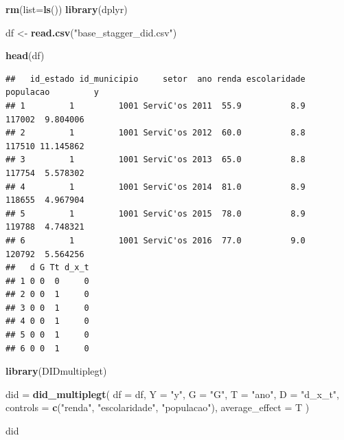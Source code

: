 \documentclass[
]{article}
\author{}
\date{\vspace{-2.5em}}
\newenvironment{Shaded}{\begin{snugshade}}{\end{snugshade}}
\newcommand{\AttributeTok}[1]{\textcolor[rgb]{0.13,0.29,0.53}{#1}}
\newcommand{\FunctionTok}[1]{\textcolor[rgb]{0.13,0.29,0.53}{\textbf{#1}}}
\newcommand{\NormalTok}[1]{#1}
\newcommand{\OtherTok}[1]{\textcolor[rgb]{0.56,0.35,0.01}{#1}}
\newcommand{\StringTok}[1]{\textcolor[rgb]{0.31,0.60,0.02}{#1}}
\begin{document}
\begin{Shaded}
\begin{Highlighting}[]
\FunctionTok{rm}\NormalTok{(}\AttributeTok{list=}\FunctionTok{ls}\NormalTok{())}
\FunctionTok{library}\NormalTok{(dplyr)}

\NormalTok{df }\OtherTok{\textless{}{-}} \FunctionTok{read.csv}\NormalTok{(}\StringTok{"base\_stagger\_did.csv"}\NormalTok{)}

\FunctionTok{head}\NormalTok{(df)}
\end{Highlighting}
\end{Shaded}

\begin{verbatim}
##   id_estado id_municipio     setor  ano renda escolaridade populacao         y
## 1         1         1001 ServiC'os 2011  55.9          8.9    117002  9.804006
## 2         1         1001 ServiC'os 2012  60.0          8.8    117510 11.145862
## 3         1         1001 ServiC'os 2013  65.0          8.8    117754  5.578302
## 4         1         1001 ServiC'os 2014  81.0          8.9    118655  4.967904
## 5         1         1001 ServiC'os 2015  78.0          8.9    119788  4.748321
## 6         1         1001 ServiC'os 2016  77.0          9.0    120792  5.564256
##   d G Tt d_x_t
## 1 0 0  0     0
## 2 0 0  1     0
## 3 0 0  1     0
## 4 0 0  1     0
## 5 0 0  1     0
## 6 0 0  1     0
\end{verbatim}

\begin{Shaded}
\begin{Highlighting}[]
\FunctionTok{library}\NormalTok{(DIDmultiplegt)}
\end{Highlighting}
\end{Shaded}

\begin{Shaded}
\begin{Highlighting}[]
\NormalTok{did }\OtherTok{=} \FunctionTok{did\_multiplegt}\NormalTok{(}
  \AttributeTok{df =}\NormalTok{ df,}
  \AttributeTok{Y =} \StringTok{"y"}\NormalTok{,}
  \AttributeTok{G =} \StringTok{"G"}\NormalTok{,}
  \AttributeTok{T =} \StringTok{"ano"}\NormalTok{,}
  \AttributeTok{D =} \StringTok{"d\_x\_t"}\NormalTok{,}
  \AttributeTok{controls =} \FunctionTok{c}\NormalTok{(}\StringTok{"renda"}\NormalTok{, }\StringTok{"escolaridade"}\NormalTok{, }\StringTok{"populacao"}\NormalTok{),}
  \AttributeTok{average\_effect =}\NormalTok{ T}
\NormalTok{)}

\NormalTok{did}
\end{Highlighting}
\end{Shaded}
\end{document}
